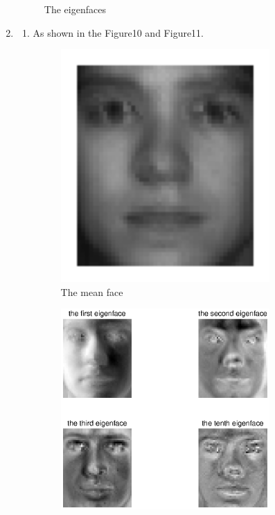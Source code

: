 \documentclass[english,onecolumn]{IEEEtran}
\begin{document}
\begin{enumerate}
\begin{figure}[htbp]
				\caption{The eigenfaces}
			\end{figure}
\item
	\begin{enumerate}
		\item
		As shown in the Figure10 and Figure11.\\
			\begin{figure}[htbp]
						\centering
						\includegraphics[width=0.8\textwidth]{fig4_2_a_1.eps}
						\caption{The mean face}
			\end{figure}
			\begin{figure}[htbp]
						\centering
						\includegraphics[width=0.8\textwidth]{fig4_2_a_2.eps}

\end{figure}
\end{enumerate}
\end{enumerate}
\end{document}

